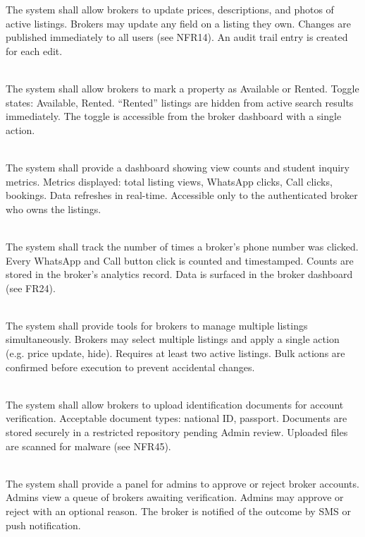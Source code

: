 The system shall allow brokers to update prices, descriptions, and photos of active listings. Brokers may update any field on a listing they own. Changes are published immediately to all users (see NFR14). An audit trail entry is created for each edit.
\item[\textbf{FR23: Availability Toggle} (Priority: Must)]\\
The system shall allow brokers to mark a property as Available or Rented. Toggle states: Available, Rented. “Rented” listings are hidden from active search results immediately. The toggle is accessible from the broker dashboard with a single action.
\item[\textbf{FR24: Broker Dashboard} (Priority: Should)]\\
The system shall provide a dashboard showing view counts and student inquiry metrics. Metrics displayed: total listing views, WhatsApp clicks, Call clicks, bookings. Data refreshes in real-time. Accessible only to the authenticated broker who owns the listings.
\item[\textbf{FR25: Inquiry Tracking} (Priority: Could)]\\
The system shall track the number of times a broker’s phone number was clicked. Every WhatsApp and Call button click is counted and timestamped. Counts are stored in the broker’s analytics record. Data is surfaced in the broker dashboard (see FR24).
\item[\textbf{FR26: Bulk Management} (Priority: Could)]\\
The system shall provide tools for brokers to manage multiple listings simultaneously. Brokers may select multiple listings and apply a single action (e.g. price update, hide). Requires at least two active listings. Bulk actions are confirmed before execution to prevent accidental changes.
\item[\textbf{FR27: Identity Submission} (Priority: Must)]\\
The system shall allow brokers to upload identification documents for account verification. Acceptable document types: national ID, passport. Documents are stored securely in a restricted repository pending Admin review. Uploaded files are scanned for malware (see NFR45).
\item[\textbf{FR28: Broker Verification Panel} (Priority: Must)]\\
The system shall provide a panel for admins to approve or reject broker accounts. Admins view a queue of brokers awaiting verification. Admins may approve or reject with an optional reason. The broker is notified of the outcome by SMS or push notification.
